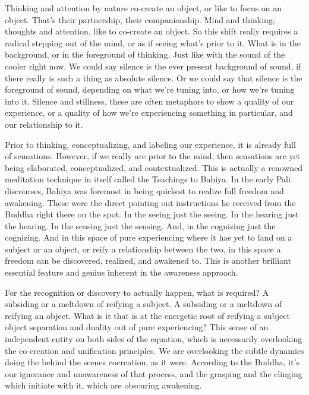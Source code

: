 \documentclass[12pt,openany]{book}
\begin{document}
Thinking and attention by nature co-create an object, or like to focus on an object. That's their partnership, their companionship. Mind and thinking, thoughts and attention, like to co-create an object. So this shift really requires a radical stepping out of the mind, or as if seeing what’s prior to it. What is in the background, or in the foreground of thinking. Just like with the sound of the cooler right now. We could say silence is the ever present background of sound, if there really is such a thing as absolute silence. Or we could say that silence is the foreground of sound, depending on what we're tuning into, or how we're tuning into it. Silence and stillness, these are often meta\-phors to show a quality of our experience, or a quality of how we're experiencing something in particular, and our relationship to it.

Prior to thinking, conceptualizing, and labeling our experience, it is already full of sensations. However, if we really are prior to the mind, then sensations are yet being elaborated, conceptualized, and contextualized. This is actually a renowned meditation technique in itself called the Teachings to Bahiya. In the early Pali discourses, \linebreak Bahiya was foremost in being quickest to realize full freedom and awakening. These were the direct pointing out instructions he \linebreak received from the Buddha right there on the spot. In the seeing just the seeing. In the hearing just the hearing. In the sensing just the sensing. And, in the cognizing just the cognizing. And in this space of pure experiencing where it has yet to land on a subject or an object, or reify a relationship between the two, in this space a freedom can be discovered, realized, and awakened to. This is another brilliant essential feature and genius inherent in the awareness approach.

For the recognition or discovery to actually happen, what is required? A subsiding or a meltdown of reifying a subject. A subsiding or a meltdown of reifying an object. What is it that is at the energetic root of reifying a subject object separation and duality out of pure experiencing? This sense of an independent entity on both sides of the equation, which is necessarily overlooking the co-creation and unification principles. We are overlooking the subtle dynamics doing the behind the scenes cocreation, as it were. According to the Buddha, it’s our ignorance and unawareness of that process, and the grasping and the clinging which initiate with it, which are obscuring awakening.
\end{document}
